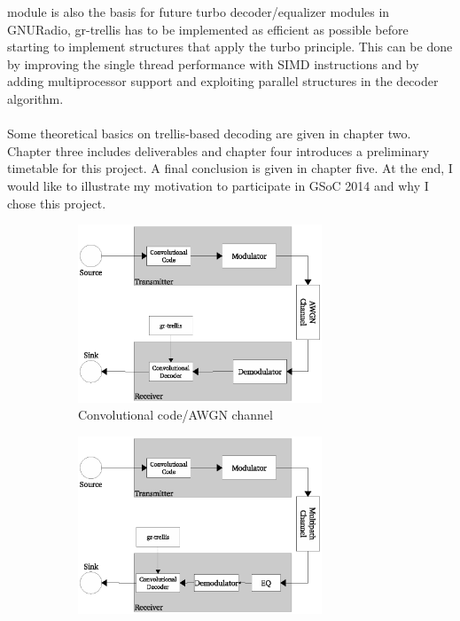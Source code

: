 \documentclass[11pt,		%
	    DIV12,		%
	    a4paper,		%
	    final,		%
	    halfparskip,	%
	    ]{scrartcl}		%
\begin{document}
module is also the basis for future turbo decoder/equalizer modules in GNURadio, gr-trellis has to be implemented as efficient as possible before starting to implement structures that apply the turbo principle. This can be done by improving the single thread performance with SIMD instructions and by adding multiprocessor support and exploiting parallel structures in the decoder algorithm.\\ \\Some theoretical basics on trellis-based decoding are given in chapter two. Chapter three includes deliverables and chapter four introduces a preliminary timetable for this project. A final conclusion is given in chapter five. At the end, I would like to illustrate my motivation to participate in GSoC 2014 and why I chose this project.  
\begin{figure}[htbp] 
  \centering
  \begin{subfigure}[bt]{0.45\textwidth}
       \includegraphics[width=0.8\textwidth]{figures/dec.eps}
  \caption{Convolutional code/AWGN channel}
    \label{fig:dec}
  \end{subfigure}
  \begin{subfigure}[bt] {0.45\textwidth}
     \includegraphics[width=0.8\textwidth]{figures/deceq.eps}

\end{subfigure}
\end{figure}
\end{document}
